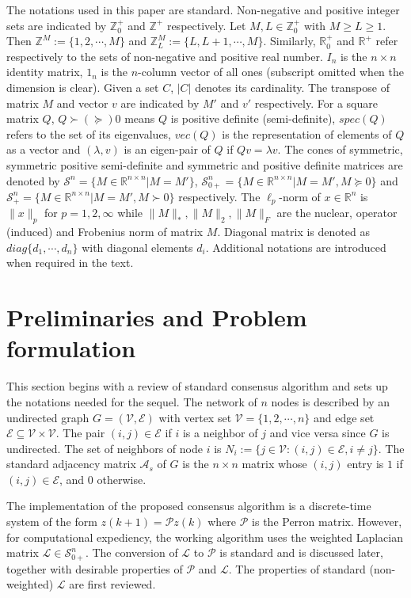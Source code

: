 \documentclass[onecolumn,reviewcopy]{autart}
\def \L{\mathcal{L}}
\def \E{\mathcal{E}}
\def \V{\mathcal{V}}
\def \S{\mathcal{S}}
\def \D{\mathcal{D}}
\def \A{\mathcal{A}}
\def \P{\mathcal{P}}
\def \Z{\mathbb{Z}}
\begin{document}
The notations used in this paper are standard. Non-negative and positive integer sets are indicated by $\mathbb{Z}^+_0$ and $\mathbb{Z}^+$ respectively. Let $M, L \in \Z^+_0$ with $M \ge L \ge 1$. Then $\mathbb{Z}^M:=\{1,2,\cdots,M\}$ and $\mathbb{Z}_L^M:=\{L,L+1,\cdots,M\}$. Similarly, $\mathbb{R}^+_0$ and $\mathbb{R}^+$ refer respectively to the sets of non-negative and positive real number. $I_n$ is the $n\times n$ identity matrix, $1_n$ is the $n$-column vector of all ones (subscript omitted when the dimension is clear). Given a set $C$, $|C|$ denotes its cardinality.  The transpose of matrix $M$ and vector $v$ are indicated by $M'$ and $v'$ respectively. For a square matrix $Q$, $Q \succ (\succeq) 0$ means $Q$ is positive definite (semi-definite), $spec(Q)$ refers to the set of its eigenvalues, $vec(Q)$ is the representation of elements of $Q$ as a vector and $(\lambda, v)$ is an eigen-pair of $Q$ if $Qv=\lambda v$. The cones of symmetric, symmetric positive semi-definite and symmetric and positive definite matrices are denoted by $\S^n=\{M \in \mathbb{R}^{n\times n} | M=M'\}$, $\S^n_{0+}=\{M \in \mathbb{R}^{n\times n} | M=M', M \succeq 0\}$ and $\S^n_+=\{M \in \mathbb{R}^{n\times n} | M=M', M \succ 0\}$ respectively.  The $\ell_p$-norm of $x\in \mathbb{R}^{n}$ is $\|x\|_p$ for $p=1,2,\infty$ while $\|M\|_*, \|M\|_2, \|M\|_F$ are the nuclear, operator (induced) and Frobenius norm of matrix $M$. Diagonal matrix is denoted as $diag\{d_1,\cdots,d_n\}$ with diagonal elements $d_i$. Additional notations are introduced when required in the text.


\section{Preliminaries and Problem formulation}\label{sec:pre}
This section begins with a review of standard consensus algorithm and sets up the notations needed for the sequel.
The network of $n$ nodes is described by an undirected graph $G = (\V,\E)$ with vertex set $\V = \{1,2,\cdots,n\}$ and edge set $\E \subseteq \V \times \V$. The pair $(i,j)\in \E$ if $i$ is a neighbor of $j$ and vice versa since $G$ is undirected. The set of neighbors of node $i$ is $N_i:=\{j\in \V: (i,j) \in \E, i \neq j\}$. The standard adjacency matrix $\A_s$ of $G$ is the $n \times n$ matrix whose $(i,j)$ entry is $1$ if $(i,j)\in \E$, and $0$ otherwise. %

The implementation of the proposed consensus algorithm is a discrete-time system of the form $z(k+1)=\P z(k)$ where $\P$ is the Perron matrix. However, for computational expediency, the working algorithm uses the weighted Laplacian matrix $\L \in \S^n_{0+}$. The conversion of $\L$ to $\P$ is standard and is discussed later, together with desirable properties of $\P$ and $\L$.
The properties of standard (non-weighted) $\L$ are first reviewed.
\end{document}
